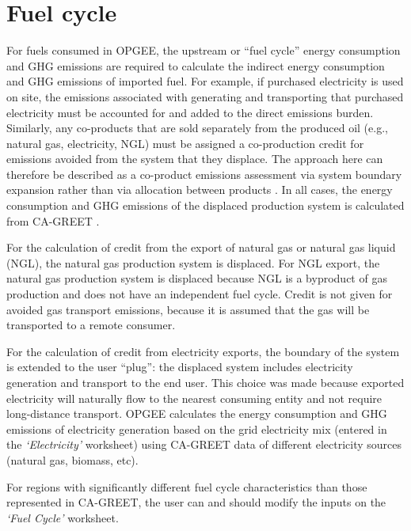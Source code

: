 \documentclass[11pt]{report}
\newcommand{\sheet}[1]{\textit{`{#1}'}}
\begin{document}
{{{{%
\section{Fuel cycle} \label{sec:fuel_cycle}

For fuels consumed in OPGEE, the upstream or ``fuel cycle'' energy consumption and GHG emissions are required to calculate the indirect energy consumption and GHG emissions of imported fuel. For example, if purchased electricity is used on site, the emissions associated with generating and transporting that purchased electricity must be accounted for and added to the direct emissions burden. Similarly, any co-products that are sold separately from the produced oil (e.g., natural gas, electricity, NGL) must be assigned a co-production credit for emissions avoided from the system that they displace. The approach here can therefore be described as a co-product emissions assessment via system boundary expansion rather than via allocation between products \cite{ISO2006a, ISO2006b}. In all cases, the energy consumption and GHG emissions of the displaced production system is calculated from CA-GREET \cite{Wang2009}. 

For the calculation of credit from the export of natural gas or natural gas liquid (NGL), the natural gas production system is displaced. For NGL export, the natural gas production system is displaced because NGL is a byproduct of gas production and does not have an independent fuel cycle. Credit is not given for avoided gas transport emissions, because it is assumed that the gas will be transported to a remote consumer.

For the calculation of credit from electricity exports, the boundary of the system is extended to the user ``plug'': the displaced system includes electricity generation and transport to the end user. This choice was made because exported electricity will naturally flow to the nearest consuming entity and not require long-distance transport. OPGEE calculates the energy consumption and GHG emissions of electricity generation based on the grid electricity mix (entered in the \sheet{Electricity} worksheet) using CA-GREET data of different electricity sources (natural gas, biomass, etc).

For regions with significantly different fuel cycle characteristics than those represented in CA-GREET, the user can and should modify the inputs on the \sheet{Fuel Cycle} worksheet.

\newpage

}}}}
\end{document}
